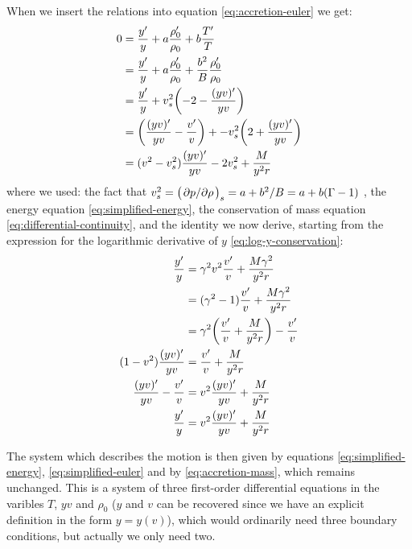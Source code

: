 \documentclass[main.tex]{subfiles}
\begin{document}
When we insert the relations into equation \eqref{eq:accretion-euler} we get:
%
\begin{subequations}
\begin{align}
  0 &= \frac{y ^{\prime}}{y} + a \frac{\rho_0 ^{\prime}}{\rho_0} + b \frac{T ^{\prime}}{T}  \\
  &= \frac{y ^{\prime}}{y} + a \frac{\rho_0 ^{\prime}}{\rho_0} + \frac{b^2}{B} \frac{\rho_0 ^{\prime}}{\rho_0}   \\
  &= \frac{y ^{\prime}}{y} + v_s^2 \qty(-2- \frac{(yv) ^{\prime}}{yv})    \\
  &= \qty(\frac{(yv) ^{\prime}}{yv} - \frac{v ^{\prime}}{v} ) + -v_s^2 \qty(2 + \frac{(yv) ^{\prime}}{yv})    \\
  &=  (v^2 - v_s^2) \frac{(yv) ^{\prime}}{yv} - 2 v_s^2 + \frac{M}{y^2r} \label{eq:simplified-euler}
\end{align}
\end{subequations}
%
where we used: the fact that \(v_s^2 = \qty(\pdv*{p}{\rho})_s = a + b^2 / B = a + b (\Gamma - 1)\) \cite[eq. B12]{Flammang:1982}, the energy equation \eqref{eq:simplified-energy}, the conservation of mass equation \eqref{eq:differential-continuity}, and the identity we now derive, starting from the expression for the logarithmic derivative of \(y\) \eqref{eq:log-y-conservation}:
%
\begin{subequations}
\begin{align}
  \frac{y ^{\prime}}{y}  &=  \gamma^2 v^2 \frac{v ^{\prime}}{v} + \frac{M \gamma^2}{y^2 r}  \\
  &= (\gamma^2 - 1) \frac{v ^{\prime}}{v} + \frac{M \gamma^2}{y^2 r}  \\
  &= \gamma^2 \qty(\frac{v ^{\prime}}{v} + \frac{M}{y^2 r}) - \frac{v ^{\prime}}{v}  \\
  (1-v^2) \frac{(yv) ^{\prime}}{yv} &= \frac{v ^{\prime}}{v} + \frac{M}{y^2 r}  \\
  \frac{(yv) ^{\prime}}{yv}- \frac{v ^{\prime}}{v}  &= v^2 \frac{(yv) ^{\prime}}{yv} + \frac{M}{y^2 r}  \\
  \frac{y ^{\prime}}{y} &= v^2 \frac{(yv) ^{\prime}}{yv} + \frac{M}{y^2 r}
\end{align}
\end{subequations}

The system which describes the motion is then given by equations \eqref{eq:simplified-energy}, \eqref{eq:simplified-euler} and by \eqref{eq:accretion-mass}, which remains unchanged.
This is a system of three first-order differential equations in the varibles \(T\), \(yv\) and \(\rho_0\) (\(y\) and \(v\) can be recovered since we have an explicit definition in the form \(y = y(v)\)), which would ordinarily need three boundary conditions, but actually we only need two.
\end{document}
